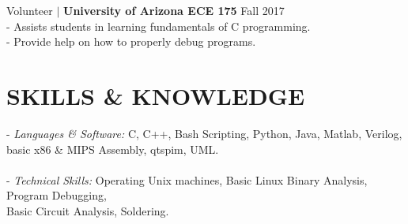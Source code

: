 \documentclass[line, 12pt]{res}
\newcommand\tab[1][0.5cm]{\hspace*{#1}}
\begin{document}
\begin{resume}
	Volunteer $\mid$ \textbf{University of Arizona ECE 175} \hfill Fall 2017 \\
		\tab - Assists students in learning fundamentals of C programming. \\
		\tab - Provide help on how to properly debug programs.

\section{SKILLS \& KNOWLEDGE} 
	- {\sl Languages \& Software:} C, C++, Bash Scripting, Python, Java, Matlab, Verilog, \\ \tab[4.48cm] basic x86 \& MIPS Assembly, qtspim, UML. \\ \\
	- {\sl Technical Skills:} Operating Unix machines, Basic Linux Binary Analysis, Program Debugging, \\ \tab[3.25cm] Basic Circuit Analysis, Soldering.
 

\end{resume}
\end{document}
